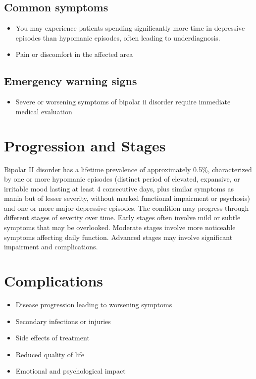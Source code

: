 \subsection{Common symptoms}
\begin{itemize}[noitemsep]
  \item You may experience patients spending significantly more time in depressive episodes than hypomanic episodes, often leading to underdiagnosis.
  \item Pain or discomfort in the affected area
  \end{itemize}
\subsection{Emergency warning signs}
\begin{itemize}[noitemsep]
  \item Severe or worsening symptoms of bipolar ii disorder require immediate medical evaluation
\end{itemize}
\section{Progression and Stages}
Bipolar II disorder has a lifetime prevalence of approximately 0.5\%, characterized by one or more hypomanic episodes (distinct period of elevated, expansive, or irritable mood lasting at least 4 consecutive days, plus similar symptoms as mania but of lesser severity, without marked functional impairment or psychosis) and one or more major depressive episodes. The condition may progress through different stages of severity over time. Early stages often involve mild or subtle symptoms that may be overlooked. Moderate stages involve more noticeable symptoms affecting daily function. Advanced stages may involve significant impairment and complications.
\section{Complications}
\begin{itemize}[noitemsep]
  \item Disease progression leading to worsening symptoms
  \item Secondary infections or injuries
  \item Side effects of treatment
  \item Reduced quality of life
  \item Emotional and psychological impact
\end{itemize}
